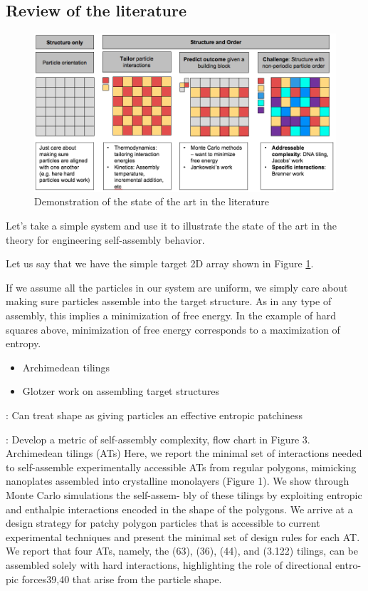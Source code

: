 \subsection{Review of the literature}

\begin{figure}[h]
\begin{center}
\includegraphics[width=6.5in]{../figures/litreview.png}
\caption{Demonstration of the state of the art in the literature}
\label{fig:litreview}
\end{center}
\end{figure}

Let's take a simple system and use it to illustrate the state of the art in the theory for engineering self-assembly behavior.

Let us say that we have the simple target 2D array shown in Figure \ref{fig:litreview}.

If we assume all the particles in our system are uniform, we simply care about making sure particles assemble into the target structure.
As in any type of assembly, this implies a minimization of free energy.
In the example of hard squares above, minimization of free energy corresponds to a maximization of entropy.

\begin{itemize}
\item Archimedean tilings
\item Glotzer work on assembling target structures
\end{itemize}


\cite{vanAnders_2014_ACSNano}: Can treat shape as giving particles an effective entropic patchiness

\cite{Millan_2014_ACSNano}:
Develop a metric of self-assembly complexity, flow chart in Figure 3.
Archimedean tilings (ATs)
Here, we report the minimal set of interactions needed to self-assemble experimentally accessible ATs from regular polygons, mimicking nanoplates assembled into crystalline monolayers (Figure 1). We show through Monte Carlo simulations the self-assem- bly of these tilings by exploiting entropic and enthalpic interactions encoded in the shape of the polygons. We arrive at a design strategy for patchy polygon particles that is accessible to current experimental techniques and present the minimal set of design rules for each AT. We report that four ATs, namely, the (63), (36), (44), and (3.122) tilings, can be assembled solely with hard interactions, highlighting the role of directional entro- pic forces39,40 that arise from the particle shape.


